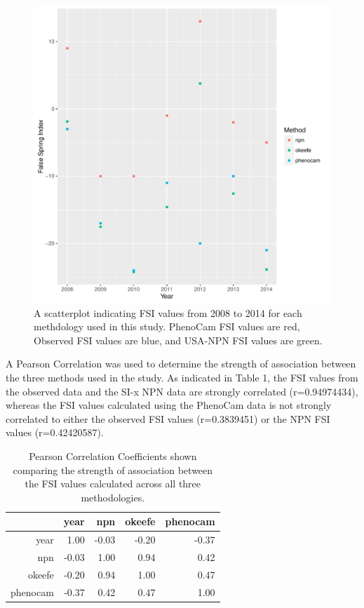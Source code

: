 \documentclass{article}\usepackage[]{graphicx}\usepackage[]{color}
\makeatletter
\def\maxwidth{ %
  \ifdim\Gin@nat@width>\linewidth
    \linewidth
  \else
    \Gin@nat@width
  \fi
}
\makeatother
\begin{document}
\begin{figure}[H]
\includegraphics[width=\maxwidth]{figure/fsifig-1} \caption[A scatterplot indicating FSI values from 2008 to 2014 for each methdology used in this study]{A scatterplot indicating FSI values from 2008 to 2014 for each methdology used in this study. PhenoCam FSI values are red, Observed FSI values are blue, and USA-NPN FSI values are green.}\label{fig:fsifig}
\end{figure}



A Pearson Correlation was used to determine the strength of association between the three methods used in the study. As indicated in Table 1, the FSI values from the observed data and the SI-x NPN data are strongly correlated (r=0.94974434), whereas the FSI values calculated using the PhenoCam data is not strongly correlated to either the observed FSI values (r=0.3839451) or the NPN FSI values (r=0.42420587).

\begin{table}[ht]
\centering
\caption{Pearson Correlation Coefficients shown comparing the strength of association between the FSI values calculated across all three methodologies.} 
\begin{tabular}{rrrrr}
  \hline
 & year & npn & okeefe & phenocam \\ 
  \hline
year & 1.00 & -0.03 & -0.20 & -0.37 \\ 
  npn & -0.03 & 1.00 & 0.94 & 0.42 \\ 
  okeefe & -0.20 & 0.94 & 1.00 & 0.47 \\ 
  phenocam & -0.37 & 0.42 & 0.47 & 1.00 \\ 
   \hline
\end{tabular}
\end{table}
\end{document}
